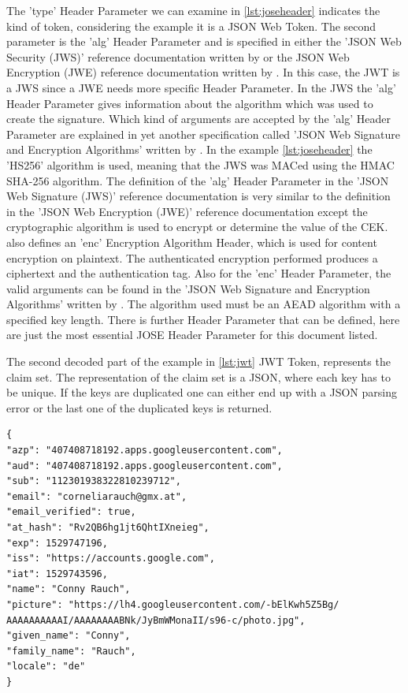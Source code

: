 {The 'type' Header Parameter we can examine in \ref{lst:joseheader} indicates the kind of token, considering the example it is a JSON Web Token. The second parameter is the 'alg' Header Parameter and is specified in either the 'JSON Web Security (JWS)' reference documentation written by \cite{JWS:IETF:Jones:2015} or the JSON Web Encryption (JWE) reference documentation written by \cite{JWE:IETF:Jones:2015}. In this case, the JWT is a JWS since a JWE needs more specific Header Parameter. In the JWS the 'alg' Header Parameter gives information about the algorithm which was used to create the signature. Which kind of arguments are accepted by the 'alg' Header Parameter are explained in yet another specification called 'JSON Web Signature and Encryption Algorithms' written by \cite{JWA:Jones:2015}. In the example \ref{lst:joseheader} the 'HS256' algorithm is used, meaning that the JWS was MACed using the HMAC SHA-256 algorithm. The definition of the 'alg' Header Parameter in the 'JSON Web Signature (JWS)' reference documentation is very similar to the definition in the 'JSON Web Encryption (JWE)' reference documentation except the cryptographic algorithm is used to encrypt or determine the value of the CEK. \cite{JWE:IETF:Jones:2015} also defines an 'enc' Encryption Algorithm Header, which is used for content encryption on plaintext. The authenticated encryption performed produces a ciphertext and the authentication tag. Also for the 'enc' Header Parameter, the valid arguments can be found in the 'JSON Web Signature and Encryption Algorithms' written by \cite{JWA:Jones:2015}. The algorithm used must be an AEAD algorithm with a specified key length. There is further Header Parameter that can be defined, here are just the most essential JOSE Header Parameter for this document listed. 

The second decoded part of the example in \ref{lst:jwt} JWT Token, represents the claim set. The representation of the claim set is a JSON, where each key has to be unique. If the keys are duplicated one can either end up with a JSON parsing error or the last one of the duplicated keys is returned. 

\begin{lstlisting}
{
"azp": "407408718192.apps.googleusercontent.com",
"aud": "407408718192.apps.googleusercontent.com",
"sub": "112301938322810239712",
"email": "corneliarauch@gmx.at",
"email_verified": true,
"at_hash": "Rv2QB6hg1jt6QhtIXneieg",
"exp": 1529747196,
"iss": "https://accounts.google.com",
"iat": 1529743596,
"name": "Conny Rauch",
"picture": "https://lh4.googleusercontent.com/-bElKwh5Z5Bg/
AAAAAAAAAAI/AAAAAAAABNk/JyBmWMonaII/s96-c/photo.jpg",
"given_name": "Conny",
"family_name": "Rauch",
"locale": "de"
}
\end{lstlisting}

}
